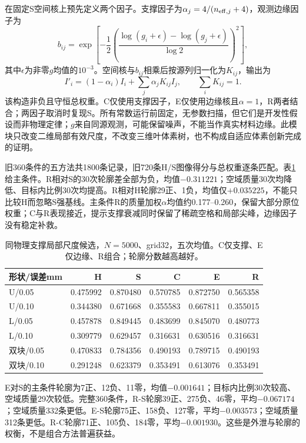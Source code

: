 \documentclass[UTF8,fontset=none,zihao=-4,a4paper]{ctexart}
\begin{document}
在固定S空间核上预先定义两个因子。支撑因子为$\alpha_j=4/(n_{{\rm eff},j}+4)$，观测边缘因子为
\begin{equation}
b_{ij}=\exp\left[-\frac{1}{2}\left(\frac{\log(g_i+\epsilon)-\log(g_j+\epsilon)}{\log 2}\right)^2\right],
\end{equation}
其中$\epsilon$为非零$g$均值的$10^{-3}$。空间核与$b_{ij}$相乘后按源列归一化为$K_{ij}$，输出为
\begin{equation}
I'_i=(1-\alpha_i)I_i+\sum_j\alpha_jK_{ij}I_j,\qquad\sum_iK_{ij}=1.
\end{equation}
该构造非负且守恒总权重。C仅使用支撑因子，E仅使用边缘核且$\alpha=1$，R两者结合；两因子取消时复现S。所有常数运行前固定，无参数扫描，但它们是开发性假设而非物理定律；$g$来自同源观测，可能保留噪声，不能当作真实材料边缘。此模块只改变二维局部有效尺度，不改变三维叶体素树，也不构成自适应体素创新完成的证明。

旧360条件的五方法共1800条记录，旧720条H/S图像得分与总权重逐条匹配。表\ref{tab:local-scale-candidate}给主条件。R相对S的30次轮廓差全部为负，均值$-0.311221$；空域质量30次均降低、目标内比例30次均提高。R相对H轮廓29正、1负，均值仅$+0.035225$，不能只比较H而忽略S强基线。主条件R的质量加权$\alpha$均值约0.177--0.260，保留大部分原位权重；C与R表现接近，提示支撑衰减同时保留了稀疏空格和局部尖峰，边缘因子没有稳定补救。

\begin{table}[H]
\centering
\caption{同物理支撑局部尺度候选，$N=5000$、grid32，五次均值。C仅支撑、E仅边缘、R组合；轮廓分数越高越好。}
\label{tab:local-scale-candidate}
\small
\begin{tabular}{lrrrrr}
\toprule
形状/误差mm & H & S & C & E & R\\
\midrule
U/0.05 & 0.475992 & 0.870480 & 0.570785 & 0.872750 & 0.565358\\
U/0.10 & 0.344380 & 0.671668 & 0.355583 & 0.667811 & 0.355015\\
L/0.05 & 0.457878 & 0.849445 & 0.483699 & 0.845070 & 0.480773\\
L/0.10 & 0.309779 & 0.629457 & 0.316631 & 0.630516 & 0.316631\\
双块/0.05 & 0.470833 & 0.784356 & 0.490193 & 0.789715 & 0.490193\\
双块/0.10 & 0.291248 & 0.623379 & 0.353491 & 0.613076 & 0.353491\\
\bottomrule
\end{tabular}
\end{table}

E对S的主条件轮廓为7正、12负、11零，均值$-0.001641$；目标内比例30次较高、空域质量29次较低。完整360条件，R-S轮廓39正、275负、46零，平均$-0.067174$；空域质量332条更低。E-S轮廓75正、158负、127零，平均$-0.003573$；空域质量312条更低。R-C轮廓71正、105负、184零，平均$-0.001930$。这些是外泄与轮廓的权衡，不是组合方法普遍获益。
\end{document}

